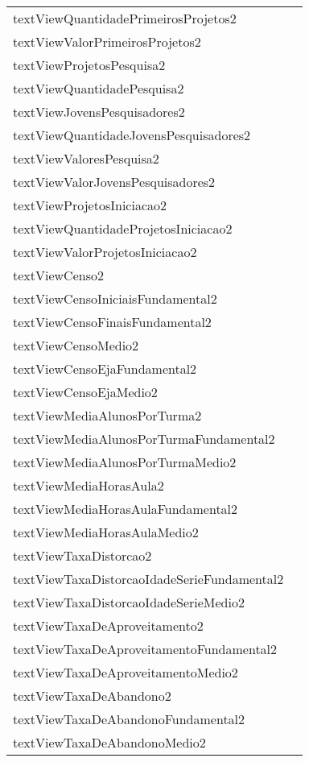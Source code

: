 \documentclass[12pt]{article}
\begin{document}
\begin{table}[H]
\begin{center}
\begin{tabular}{l | l}
						textViewQuantidadePrimeirosProjetos2 & \\
						textViewValorPrimeirosProjetos2 & \\
						textViewProjetosPesquisa2 & \\
						textViewQuantidadePesquisa2 & \\
						textViewJovensPesquisadores2 & \\
						textViewQuantidadeJovensPesquisadores2 & \\
						textViewValoresPesquisa2 & \\
						textViewValorJovensPesquisadores2 & \\
						textViewProjetosIniciacao2 & \\
						textViewQuantidadeProjetosIniciacao2 & \\
						textViewValorProjetosIniciacao2 & \\
						textViewCenso2 & \\
						textViewCensoIniciaisFundamental2 & \\
						textViewCensoFinaisFundamental2 & \\
						textViewCensoMedio2 & \\
						textViewCensoEjaFundamental2 & \\
						textViewCensoEjaMedio2 & \\
						textViewMediaAlunosPorTurma2 & \\
						textViewMediaAlunosPorTurmaFundamental2 & \\
						textViewMediaAlunosPorTurmaMedio2 & \\
						textViewMediaHorasAula2 & \\
						textViewMediaHorasAulaFundamental2 & \\
						textViewMediaHorasAulaMedio2 & \\
						textViewTaxaDistorcao2 & \\
						textViewTaxaDistorcaoIdadeSerieFundamental2 & \\
						textViewTaxaDistorcaoIdadeSerieMedio2 & \\
						textViewTaxaDeAproveitamento2 & \\
						textViewTaxaDeAproveitamentoFundamental2 & \\
						textViewTaxaDeAproveitamentoMedio2 & \\
						textViewTaxaDeAbandono2 & \\
						textViewTaxaDeAbandonoFundamental2 & \\
						textViewTaxaDeAbandonoMedio2 & \\

\end{tabular}
\end{center}
\end{table}
\end{document}
